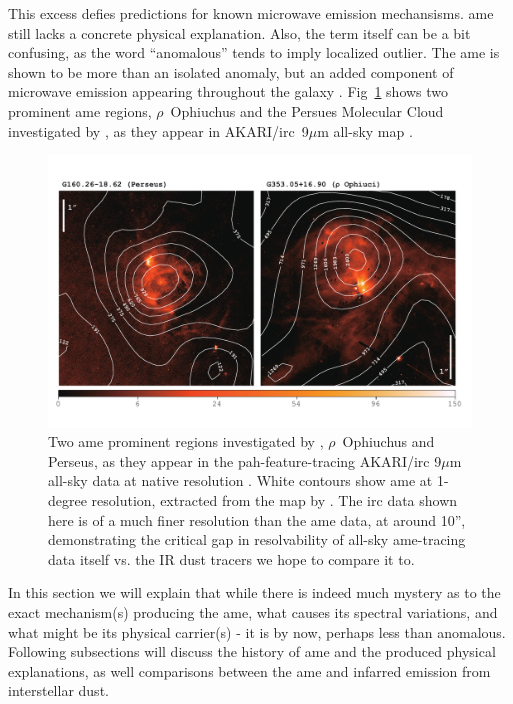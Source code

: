         This excess defies predictions for known microwave emission mechansisms. \acrshort{ame} still lacks a concrete physical explanation. Also, the term itself can be a bit confusing, as the word ``anomalous'' tends to imply localized outlier. The \acrshort{ame} is shown to be more than an isolated anomaly, but an added component of microwave emission appearing throughout the galaxy \citep{deoliveiracosta97,wmap03b,dickinson13r}. Fig~\ref{fig:AME_contours} shows two prominent \acrshort{ame} regions, $\rho{}$~Ophiuchus and the Persues Molecular Cloud investigated by \cite{tibbs11,planckxx11}, as they appear in AKARI/\acrshort{irc}~9$\mu$m all-sky map \citep{ishihara10}.
            \begin{figure}
              \centering
              \includegraphics[width=\textwidth]{../Plots/ch_intro/AME_contours.pdf}
                \caption{Two \acrshort{ame} prominent regions investigated by \cite{planckxx11, tibbs11}, $\rho$~Ophiuchus and Perseus, as they appear in the \acrshort{pah}-feature-tracing AKARI/\acrshort{irc} 9$\mu$m all-sky data at native resolution \citep{ishihara10}. White contours show \acrshort{ame} at 1-degree resolution, extracted from the map by  \cite{planck15X}. The \acrshort{irc} data shown here is of a much finer resolution than the \acrshort{ame} data, at around 10'', demonstrating the critical gap in resolvability of all-sky \acrshort{ame}-tracing data itself vs. the IR dust tracers we hope to compare it to. }
              \label{fig:AME_contours}
            \end{figure}
        In this section we will explain that while there is indeed much mystery as to the exact mechanism(s) producing the \acrshort{ame}, what causes its spectral variations, and what might be its physical carrier(s) - it is by now, perhaps less than anomalous. Following subsections will discuss the history of \acrshort{ame} and the produced physical explanations, as well comparisons between the \acrshort{ame} and infarred emission from interstellar dust.

